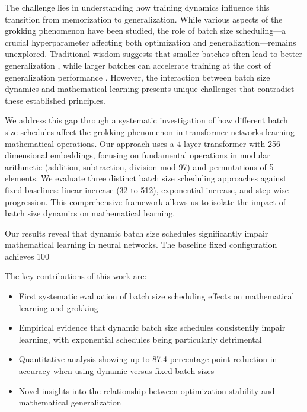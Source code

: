 \documentclass{article} %
\begin{document}
The challenge lies in understanding how training dynamics influence this transition from memorization to generalization. While various aspects of the grokking phenomenon have been studied, the role of batch size scheduling—a crucial hyperparameter affecting both optimization and generalization—remains unexplored. Traditional wisdom suggests that smaller batches often lead to better generalization \citep{Masters2018RevisitingSB}, while larger batches can accelerate training at the cost of generalization performance \citep{Keskar2016OnLT}. However, the interaction between batch size dynamics and mathematical learning presents unique challenges that contradict these established principles.

We address this gap through a systematic investigation of how different batch size schedules affect the grokking phenomenon in transformer networks learning mathematical operations. Our approach uses a 4-layer transformer with 256-dimensional embeddings, focusing on fundamental operations in modular arithmetic (addition, subtraction, division mod 97) and permutations of 5 elements. We evaluate three distinct batch size scheduling approaches against fixed baselines: linear increase (32 to 512), exponential increase, and step-wise progression. This comprehensive framework allows us to isolate the impact of batch size dynamics on mathematical learning.

Our results reveal that dynamic batch size schedules significantly impair mathematical learning in neural networks. The baseline fixed configuration achieves 100%

The key contributions of this work are:
\begin{itemize}
    \item First systematic evaluation of batch size scheduling effects on mathematical learning and grokking
    \item Empirical evidence that dynamic batch size schedules consistently impair learning, with exponential schedules being particularly detrimental
    \item Quantitative analysis showing up to 87.4 percentage point reduction in accuracy when using dynamic versus fixed batch sizes
    \item Novel insights into the relationship between optimization stability and mathematical generalization
\end{itemize}
\end{document}

